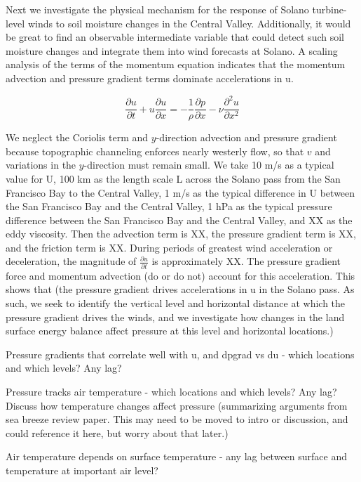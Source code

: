 \documentclass[12pt]{amsart}
\begin{document}
Next we investigate the physical mechanism for the response of Solano turbine-level winds to soil moisture changes in the Central Valley.  Additionally, it would be great to find an observable intermediate variable that could detect such soil moisture changes and integrate them into wind forecasts at Solano.  A scaling analysis of the terms of the momentum equation indicates that the momentum advection and pressure gradient terms dominate accelerations in u.  

\begin{equation}
\frac{\partial u}{\partial t} + u\frac{\partial u}{\partial x} = -\frac{1}{\rho} \frac{\partial p}{\partial x} - \nu \frac{\partial^2 u}{\partial x^2}
\end{equation}

We neglect the Coriolis term and $y$-direction advection and pressure gradient because topographic channeling enforces nearly westerly flow, so that $v$ and variations in the $y$-direction must remain small.  We take 10 m/s as a typical value for U, 100 km as the length scale L across the Solano pass from the San Francisco Bay to the Central Valley, 1 m/s as the typical difference in U between the San Francisco Bay and the Central Valley, 1 hPa as the typical pressure difference between the San Francisco Bay and the Central Valley, and XX as the eddy viscosity. Then the advection term is XX, the pressure gradient term is XX, and the friction term is XX.  During periods of greatest wind acceleration or deceleration, the magnitude of $\frac{\partial u}{\partial t}$ is approximately XX.  The pressure gradient force and momentum advection (do or do not) account for this acceleration.  This shows that (the pressure gradient drives accelerations in u in the Solano pass.  As such, we seek to identify the vertical level and horizontal distance at which the pressure gradient drives the winds, and we investigate how changes in the land surface energy balance affect pressure at this level and horizontal locations.)

Pressure gradients that correlate well with u, and dpgrad vs du - which locations and which levels?  Any lag?

Pressure tracks air temperature - which locations and which levels?  Any lag?  Discuss how temperature changes affect pressure (summarizing arguments from sea breeze review paper.  This may need to be moved to intro or discussion, and could reference it here, but worry about that later.)

Air temperature depends on surface temperature - any lag between surface and temperature at important air level?
\end{document}
